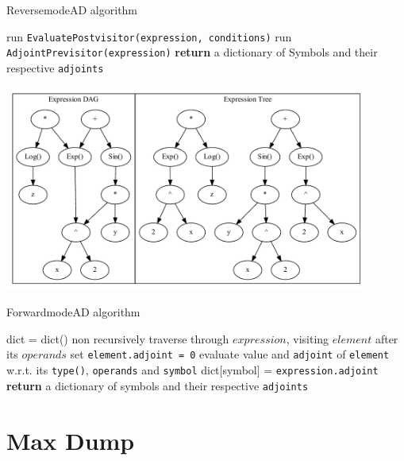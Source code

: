 \documentclass{article}
\begin{document}
\begin{algorithm}
\caption{ReversemodeAD algorithm}\label{reverseAD}
\begin{algorithmic}[1]
\State run \verb|EvaluatePostvisitor(expression, conditions)|
\State run \verb|AdjointPrevisitor(expression)|
\State \textbf{return} a dictionary of Symbols and their respective \verb|adjoints|
\EndProcedure
\end{algorithmic}
\end{algorithm}

\begin{center}
    \includegraphics[width=12cm]{images/graph.gv.pdf}
\end{center}

\begin{algorithm}
\caption{ForwardmodeAD algorithm}\label{forwardAD}
\begin{algorithmic}[1]
\State dict = dict()
\State non recursively traverse through $expression$, visiting $element$ after its $operands$
    \State set \verb|element.adjoint = 0|
    \State evaluate value and \verb|adjoint| of \verb|element| w.r.t. its \verb|type()|, \verb|operands| and \verb|symbol|
    \State dict[symbol] = \verb|expression.adjoint|
    \EndFor
\EndFor
\State \textbf{return} a dictionary of symbols and their respective \verb|adjoints|
\EndProcedure
\end{algorithmic}
\end{algorithm}



\section{Max Dump}
\end{document}
